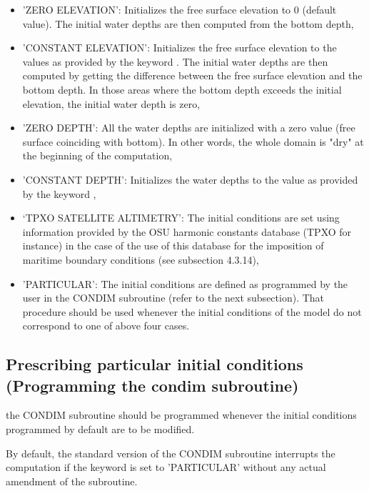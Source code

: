\begin{itemize}
\item 'ZERO ELEVATION': Initializes the free surface elevation
to 0 (default value). The initial water depths are then computed from the
bottom depth,

\item 'CONSTANT ELEVATION': Initializes the free surface elevation to the
values as provided by the keyword . The initial water
depths are then computed by getting the difference between the free surface
elevation and the bottom depth.  In those areas where the bottom depth exceeds
the initial elevation, the initial water depth is zero,

\item 'ZERO DEPTH': All the water depths are initialized with a zero value
(free surface coinciding with bottom). In other words, the whole domain is
"dry" at the beginning of the computation,

\item 'CONSTANT DEPTH': Initializes the water depths to the value as provided
by the keyword ,

\item `TPXO SATELLITE ALTIMETRY': The initial conditions are set using
information provided by the OSU harmonic constants database (TPXO for instance)
in the case of the use of this database for the imposition of maritime boundary
conditions (see subsection 4.3.14),

\item 'PARTICULAR': The initial conditions are defined as programmed by the
user in the CONDIM subroutine (refer to the next subsection). That procedure
should be used whenever the initial conditions of the model do not correspond
to one of above four cases.
\end{itemize}


\subsection{Prescribing particular initial conditions (Programming the condim subroutine)}

the CONDIM subroutine should be programmed whenever the initial
conditions programmed by default are to be modified.

By default, the standard version of the CONDIM subroutine interrupts the
computation if the keyword  is set to 'PARTICULAR'
without any actual amendment of the subroutine.

